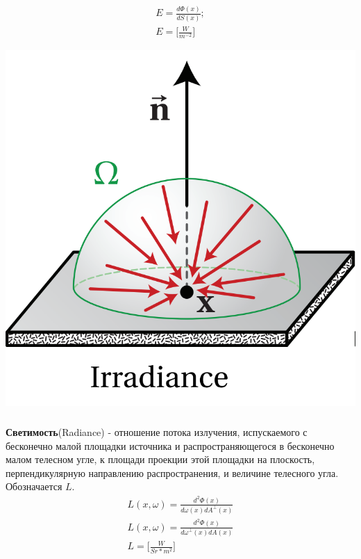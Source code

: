 \documentclass[titlepage]{article}
\begin{document}
\begin{gather}
	E = \frac{d\Phi(x)}{dS(x)}; \\E =  \bigg[\frac{W}{m^{-2}}\bigg]
\end{gather}
\begin{center}
	\includegraphics[scale=0.5]{Irradiance.png}
\end{center}
\subparagraph{} \textbf{Светимость}(Radiance) -  отношение потока излучения, испускаемого с бесконечно малой площадки источника и распространяющегося в бесконечно малом телесном угле, к площади проекции этой площадки на плоскость, перпендикулярную направлению распространения, и величине телесного угла. Обозначается $L$.
\begin{gather}
	L(x, \omega) = \frac{d^2\Phi(x)}{d\omega(x)dA^{\perp}(x)}\\
	L(x, \omega) = \frac{d^2\Phi(x)}{d\omega^{\perp}(x)dA(x)} \\
	L = \bigg[\frac{W}{Sr*m^2}\bigg]
\end{gather}
\end{document}
